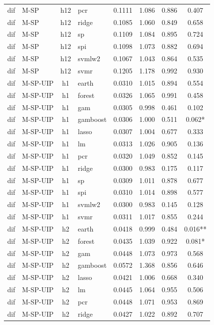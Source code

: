 \begin{ThreePartTable}
\begin{longtable}[t]{llclcccc}
dif & M-SP & h12 & pcr & 0.1111 & 1.086 & 0.886 & 0.407\\
dif & M-SP & h12 & ridge & 0.1085 & 1.060 & 0.849 & 0.658\\
dif & M-SP & h12 & sp & 0.1109 & 1.084 & 0.895 & 0.724\\
dif & M-SP & h12 & spi & 0.1098 & 1.073 & 0.882 & 0.694\\
dif & M-SP & h12 & svmlw2 & 0.1067 & 1.043 & 0.864 & 0.535\\
dif & M-SP & h12 & svmr & 0.1205 & 1.178 & 0.992 & 0.930\\
\addlinespace
dif & M-SP-UIP & h1 & earth & 0.0310 & 1.015 & 0.894 & 0.554\\
dif & M-SP-UIP & h1 & forest & 0.0326 & 1.065 & 0.991 & 0.458\\
dif & M-SP-UIP & h1 & gam & 0.0305 & 0.998 & 0.461 & 0.102\\
dif & M-SP-UIP & h1 & gamboost & 0.0306 & 1.000 & 0.511 & 0.062*\\
dif & M-SP-UIP & h1 & lasso & 0.0307 & 1.004 & 0.677 & 0.333\\
dif & M-SP-UIP & h1 & lm & 0.0313 & 1.026 & 0.905 & 0.136\\
dif & M-SP-UIP & h1 & pcr & 0.0320 & 1.049 & 0.852 & 0.145\\
dif & M-SP-UIP & h1 & ridge & 0.0300 & 0.983 & 0.175 & 0.117\\
dif & M-SP-UIP & h1 & sp & 0.0309 & 1.011 & 0.878 & 0.677\\
dif & M-SP-UIP & h1 & spi & 0.0310 & 1.014 & 0.898 & 0.577\\
dif & M-SP-UIP & h1 & svmlw2 & 0.0300 & 0.983 & 0.145 & 0.128\\
dif & M-SP-UIP & h1 & svmr & 0.0311 & 1.017 & 0.855 & 0.244\\
\addlinespace
dif & M-SP-UIP & h2 & earth & 0.0418 & 0.999 & 0.484 & 0.016**\\
dif & M-SP-UIP & h2 & forest & 0.0435 & 1.039 & 0.922 & 0.081*\\
dif & M-SP-UIP & h2 & gam & 0.0448 & 1.073 & 0.973 & 0.568\\
dif & M-SP-UIP & h2 & gamboost & 0.0572 & 1.368 & 0.856 & 0.646\\
dif & M-SP-UIP & h2 & lasso & 0.0421 & 1.006 & 0.668 & 0.340\\
dif & M-SP-UIP & h2 & lm & 0.0445 & 1.064 & 0.955 & 0.506\\
dif & M-SP-UIP & h2 & pcr & 0.0448 & 1.071 & 0.953 & 0.869\\
dif & M-SP-UIP & h2 & ridge & 0.0427 & 1.022 & 0.892 & 0.707\\

\end{longtable}
\end{ThreePartTable}
